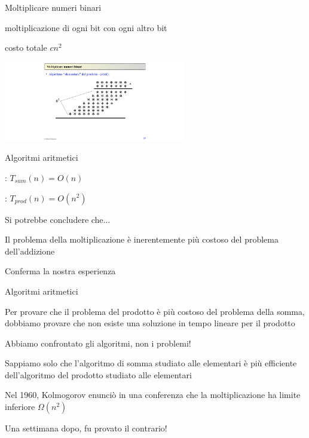 \begin{frame}{Moltiplicare numeri binari}

\begin{myboxtitle}
\BI
\item moltiplicazione di ogni bit con ogni altro bit
\item costo totale $cn^2$
\EI
\end{myboxtitle}

\medskip
\begin{center}
\includegraphics[width=8cm]{mul.pdf}
\end{center}

\end{frame}

\begin{frame}{Algoritmi aritmetici}

\begin{myboxtitle}
\BI
\item {}: $T_{sum}(n) = O(n)$
\item {}: $T_{prod}(n) = O(n^2)$
\EI
\end{myboxtitle}

\bigskip
Si potrebbe concludere che...
\BI
\item Il problema della moltiplicazione è inerentemente più costoso del problema dell'addizione
\item Conferma la nostra esperienza
\EI

\end{frame}

\begin{frame}{Algoritmi aritmetici}

\begin{myboxtitle}
Per provare che il problema del prodotto è più costoso del problema della somma, dobbiamo provare che \alert{non esiste} una soluzione in tempo lineare per il prodotto
\end{myboxtitle}

\bigskip
Abbiamo confrontato gli algoritmi, non i problemi!
\BI
\item Sappiamo solo che l'algoritmo di somma studiato alle elementari è più efficiente dell'algoritmo del prodotto studiato alle elementari
\item Nel 1960, Kolmogorov enunciò in una conferenza che la moltiplicazione ha limite inferiore $\Omega(n^2)$
\item Una settimana dopo, fu provato il contrario!
\EI

\end{frame}

